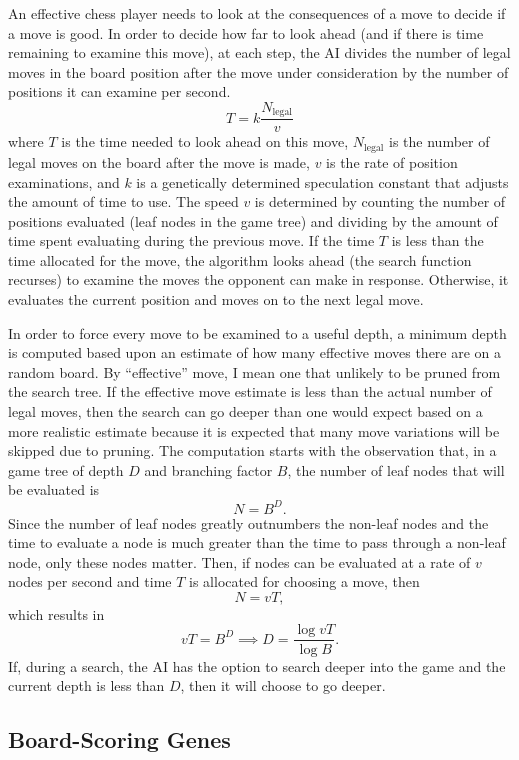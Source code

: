 \documentclass[letterpaper]{article}
\renewcommand{\_}{\allowbreak\textunderscore\allowbreak}
\begin{document}
An effective chess player needs to look at the consequences of a move to decide if a move is good. In order to decide how far to look ahead (and if there is time remaining to examine this move), at each step, the AI divides the number of legal moves in the board position after the move under consideration by the number of positions it can examine per second.
\[
T = k\frac{N_{\textrm{legal}}}{v}
\]
where \(T\) is the time needed to look ahead on this move, \(N_{\textrm{legal}}\) is the number of legal moves on the board after the move is made, \(v\) is the rate of position examinations, and \(k\) is a genetically determined speculation constant that adjusts the amount of time to use. The speed \(v\) is determined by counting the number of positions evaluated (leaf nodes in the game tree) and dividing by the amount of time spent evaluating during the previous move. If the time \(T\) is less than the time allocated for the move, the algorithm looks ahead (the search function recurses) to examine the moves the opponent can make in response. Otherwise, it evaluates the current position and moves on to the next legal move.

In order to force every move to be examined to a useful depth, a minimum depth is computed based upon an estimate of how many effective moves there are on a random board. By ``effective'' move, I mean one that unlikely to be pruned from the search tree. If the effective move estimate is less than the actual number of legal moves, then the search can go deeper than one would expect based on a more realistic estimate because it is expected that many move variations will be skipped due to pruning. The computation starts with the observation that, in a game tree of depth \(D\) and branching factor \(B\), the number of leaf nodes that will be evaluated is
\[
N = B^D.
\]
Since the number of leaf nodes greatly outnumbers the non-leaf nodes and the time to evaluate a node is much greater than the time to pass through a non-leaf node, only these nodes matter. Then, if nodes can be evaluated at a rate of \(v\) nodes per second and time \(T\) is allocated for choosing a move, then
\[
N = vT,
\]
which results in
\[
vT = B^D \implies D = \frac{\log{vT}}{\log{B}}.
\]
If, during a search, the AI has the option to search deeper into the game and the current depth is less than \(D\), then it will choose to go deeper.

\subsection{Board-Scoring Genes}\label{board-score-section}
\end{document}
